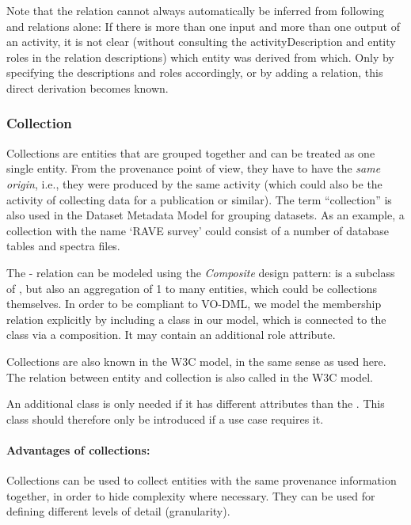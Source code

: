 Note that the  relation cannot always automatically be
inferred from following  and  relations alone:
If there is more than one input and more than one output of an activity, it is
not clear (without  consulting the activityDescription and entity roles in the
relation descriptions) which entity was derived from which. Only by specifying
the descriptions and roles accordingly, or by adding a 
relation, this direct derivation becomes known.



\subsubsection{Collection}\label{sec:collection}
Collections are entities that are grouped together and can be treated as one single entity. 
From the provenance point of view, they have to have the \emph{same origin}, i.e., they were 
produced by the same activity (which could also be the activity of collecting
data for a publication or similar). The term ``collection'' is 
also used in the Dataset Metadata Model for grouping datasets.
As an example, a collection 
with the name `RAVE survey' could consist of a number of database tables and spectra files.


The - relation can be modeled using the \emph{Composite} design pattern: 
 is a subclass of , but also an aggregation of 1 to many entities, 
which could be collections themselves. 
In order to be compliant to VO-DML, we model the membership relation explicitly 
by including a  class in our model, which is connected to the
 class via a composition. It may contain an additional role attribute.

Collections are also known in the W3C model, in the same sense as used here.
The relation between entity and collection is also called  in the W3C model.

An additional class  is only 
needed if it has different attributes than 
the . This class should therefore only be introduced if a use case requires it.

\paragraph{Advantages of collections:} Collections can be used to collect entities with the same provenance information together, 
    in order to hide complexity where necessary. They can be used for defining 
    different levels of detail (granularity).

